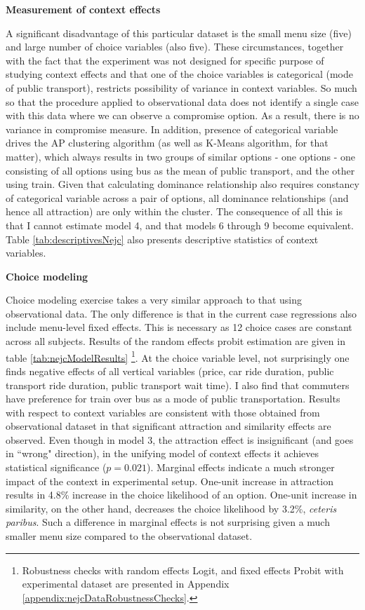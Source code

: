 \documentclass[a4paper,12pt]{article}
\begin{document}
\textbf{Measurement of context effects}

A significant disadvantage of this particular dataset is the small menu size (five) and large number of choice variables (also five). These circumstances, together with the fact that the experiment was not designed for specific purpose of studying context effects and that one of the choice variables is categorical (mode of public transport), restricts possibility of variance in context variables. So much so that the procedure applied to observational data does not identify a single case with this data where we can observe a compromise option. As a result, there is no variance in compromise measure. In addition, presence of categorical variable drives the AP clustering algorithm (as well as K-Means algorithm, for that matter), which always results in two groups of similar options - one options - one consisting of all options using bus as the mean of public transport, and the other using train. Given that calculating dominance relationship also requires constancy of categorical variable across a pair of options, all dominance relationships (and hence all attraction) are only within the cluster. The consequence of all this is that I cannot estimate model 4, and that models 6 through 9 become equivalent. Table \ref{tab:descriptivesNejc} also presents descriptive statistics of context variables.

\textbf{Choice modeling}

Choice modeling exercise takes a very similar approach to that using observational data. The only difference is that in the current case regressions also include menu-level fixed effects. This is necessary as 12 choice cases are constant across all subjects. Results of the random effects probit estimation are given in table \ref{tab:nejcModelResults} \footnote{Robustness checks with random effects Logit, and fixed effects Probit with experimental dataset are presented in Appendix \ref{appendix:nejcDataRobustnessChecks}.}.  At the choice variable level, not surprisingly one finds negative effects of all vertical variables (price, car ride duration, public transport ride duration, public transport wait time). I also find that commuters have preference for train over bus as a mode of public transportation.
Results with respect to context variables are consistent with those obtained from observational dataset in that significant attraction and similarity effects are observed. Even though in model 3, the attraction effect is insignificant (and goes in ``wrong" direction), in the unifying model of context effects it achieves statistical significance ($p = 0.021$). Marginal effects indicate a much stronger impact of the context in experimental setup. One-unit increase in attraction results in 4.8\% increase in the choice likelihood of an option. One-unit increase in similarity, on the other hand, decreases the choice likelihood by 3.2\%, \textit{ceteris paribus}. Such a difference in marginal effects is not surprising given a much smaller menu size compared to the observational dataset.
\end{document}
